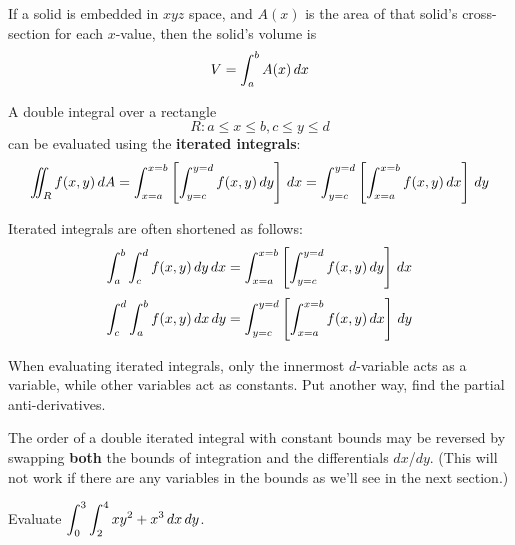 \documentclass[letterpaper, twoside, 12pt]{book}
\begin{document}
\begin{definition}
  If a solid is embedded in $xyz$ space, and $A(x)$ is the area of that
  solid's cross-section for each $x$-value, then the solid's volume is
    \[
      V  = \int_a^b A(x)\,d{x}
    \]
\end{definition}

\begin{theorem}
  A double integral over a rectangle
    \[
      R: a\leq x\leq b, c\leq y\leq d
    \]
      can be evaluated using the \textbf{iterated integrals}:
    \[
      \iint_R f(x,y)\,d{A}
        =
      \int_{x=a}^{x=b}\left[\int_{y=c}^{y=d} f(x,y)\,d{y}\right]\,d{x}
        =
      \int_{y=c}^{y=d}\left[\int_{x=a}^{x=b} f(x,y)\,d{x}\right]\,d{y}
    \]
\end{theorem}

\begin{remark}
  Iterated integrals are often shortened as follows:
    \[
      \int_{a}^{b}\int_{c}^{d} f(x,y)\,d{y}\,d{x}
        =
      \int_{x=a}^{x=b}\left[\int_{y=c}^{y=d} f(x,y)\,d{y}\right]\,d{x}
    \]
    \[
      \int_{c}^{d}\int_{a}^{b} f(x,y)\,d{x}\,d{y}
        =
      \int_{y=c}^{y=d}\left[\int_{x=a}^{x=b} f(x,y)\,d{x}\right]\,d{y}
    \]
\end{remark}

\begin{remark}
  When evaluating iterated integrals, only the innermost $d$-variable
  acts as a variable, while other variables act as constants.
  Put another way, find the partial anti-derivatives.
\end{remark}

\begin{remark}
  The order of a double iterated integral
  with constant bounds may
  be reversed by swapping \textbf{both}
  the bounds of
  integration and the differentials $dx$/$dy$.
  (This will not work if there are any variables
  in the bounds as we'll see in the next
  section.)
\end{remark}

          \begin{problem}
            Evaluate $\displaystyle\int_0^3\int_2^4 xy^2 + x^3 \,d{x}\,d{y}$.
          \end{problem}

          \begin{solution}

          \end{solution}

          \begin{contributors}
          \end{contributors}
\end{document}
